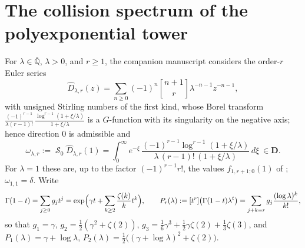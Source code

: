\documentclass[11pt,a4paper]{article}
\newcommand{\Qbar}{\overline{\mathbb Q}}
\newcommand{\DD}{\mathbf D}
\newcommand{\Dhat}{\widehat D}
\DeclareMathOperator{\Bsum}{\mathcal S}
\theoremstyle{definition}
\theoremstyle{remark}
\numberwithin{equation}{section}
\begin{document}
\section{The collision spectrum of the polyexponential tower}\label{II:sec:spectrum}

For $\lambda\in\Qbar$, $\lambda>0$, and $r\ge1$, the companion manuscript \cite[\S``The
mixed-Gevrey aperture'']{K002} considers the order-$r$ Euler series
\[
 \Dhat_{\lambda,r}(z)=\sum_{n\ge0}(-1)^n\genfrac{[}{]}{0pt}{}{n+1}{r}\lambda^{-n-1}z^{-n-1},
\]
with unsigned Stirling numbers of the first kind, whose Borel transform
$\frac{(-1)^{r-1}}{\lambda(r-1)!}\,\frac{\log^{r-1}(1+\xi/\lambda)}{1+\xi/\lambda}$ is a
$G$-function with its singularity on the negative axis; hence direction $0$ is admissible and
\begin{equation}\label{II:eq:omega}
 \omega_{\lambda,r}:=\Bsum_0\Dhat_{\lambda,r}(1)
 =\int_0^\infty e^{-\xi}\,\frac{(-1)^{r-1}\log^{r-1}(1+\xi/\lambda)}{\lambda\,(r-1)!\,(1+\xi/\lambda)}\,d\xi\ \in\DD .
\end{equation}
For $\lambda=1$ these are, up to the factor $(-1)^{r-1}r!$, the values $f_{1,r+1;0}(1)$ of
\cite[\S4]{FRmixed}; $\omega_{1,1}=\delta$. Write
\begin{equation}\label{II:eq:P}
 \Gamma(1-t)=\sum_{j\ge0}g_jt^j=\exp\Bigl(\gamma t+\sum_{k\ge2}\frac{\zeta(k)}kt^k\Bigr),
 \qquad
 P_r(\lambda):=[t^r]\bigl(\Gamma(1-t)\lambda^t\bigr)=\sum_{j+k=r}g_j\frac{(\log\lambda)^k}{k!},
\end{equation}
so that $g_1=\gamma$, $g_2=\tfrac12(\gamma^2+\zeta(2))$,
$g_3=\tfrac16\gamma^3+\tfrac12\gamma\zeta(2)+\tfrac13\zeta(3)$, and
$P_1(\lambda)=\gamma+\log\lambda$, $P_2(\lambda)=\tfrac12\bigl((\gamma+\log\lambda)^2+\zeta(2)\bigr)$.
\end{document}
